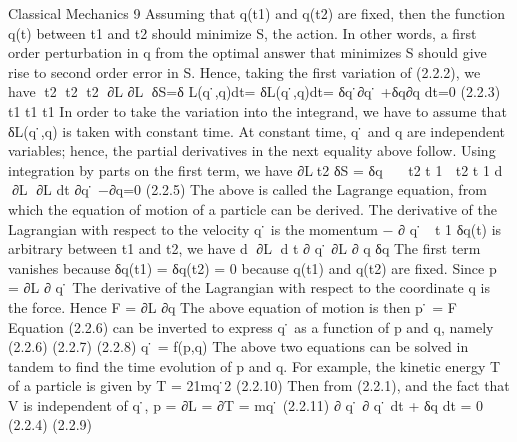 \documentclass[
  9pt,
]{extbook}
\begin{document}
Classical Mechanics 9
Assuming that q(t1) and q(t2) are fixed, then the function q(t) between t1 and t2 should minimize S, the action. In other words, a first order perturbation in q from the optimal answer that minimizes S should give rise to second order error in S. Hence, taking the first variation of (2.2.2), we have
􏰟t2 􏰟t2 􏰟t2􏰊 ∂L ∂L􏰋
δS=δ L(q ̇,q)dt= δL(q ̇,q)dt= δq ̇∂q ̇ +δq∂q dt=0 (2.2.3)
t1 t1 t1
In order to take the variation into the integrand, we have to assume that δL(q ̇,q) is taken with constant time. At constant time, q ̇ and q are independent variables; hence, the partial derivatives in the next equality above follow. Using integration by parts on the first term, we have
∂L􏰇t2 δS = δq 􏰇􏰇
􏰟 t2 t 1
􏰟 t2 t 1
d 􏰊∂L􏰋 ∂L
dt ∂q ̇ −∂q=0 (2.2.5)
The above is called the Lagrange equation, from which the equation of motion of a particle can be derived. The derivative of the Lagrangian with respect to the velocity q ̇ is the momentum
−
∂ q ̇ 􏰇 t 1
δq(t) is arbitrary between t1 and t2, we have
d 􏰊∂L􏰋 d t ∂ q ̇
∂L ∂ q
δq
The first term vanishes because δq(t1) = δq(t2) = 0 because q(t1) and q(t2) are fixed. Since
p = ∂L ∂ q ̇
The derivative of the Lagrangian with respect to the coordinate q is the force. Hence F = ∂L
∂q
The above equation of motion is then
p ̇ = F
Equation (2.2.6) can be inverted to express q ̇ as a function of p and q, namely
(2.2.6)
(2.2.7)
(2.2.8)
q ̇ = f(p,q)
The above two equations can be solved in tandem to find the time evolution of p and q.
For example, the kinetic energy T of a particle is given by
T = 21mq ̇2 (2.2.10)
Then from (2.2.1), and the fact that V is independent of q ̇,
p = ∂L = ∂T = mq ̇ (2.2.11) ∂ q ̇ ∂ q ̇
dt +
δq
dt = 0 (2.2.4)
(2.2.9)
\end{document}
